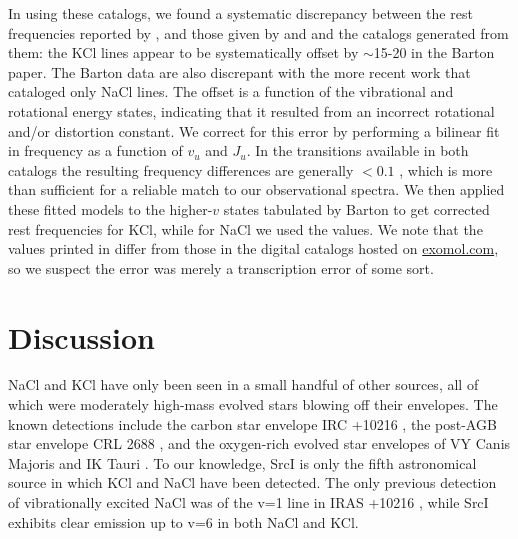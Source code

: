 \documentclass[twocolumn]{aastex62}
\newcommand{\sourcei}{SrcI\xspace}
\begin{document}
In using these catalogs, we found a systematic discrepancy between the rest
frequencies reported by \citet{Barton2014a}, and those given by
\citet{Caris2004a} and \citet{Caris2002a} and the catalogs generated from them:
the KCl lines appear to be systematically offset by $\sim$15-20 \kms in the
Barton paper.  The Barton data are also discrepant with the more recent
\citet{Cabezas2016a} work that cataloged only NaCl lines. The offset is a
function of the vibrational and rotational energy states, indicating that it
resulted from an incorrect rotational and/or distortion constant.  We correct
for this error by performing a bilinear fit in frequency as a function of $v_u$
and $J_u$.  In the transitions available in both catalogs the resulting
frequency differences are generally $<0.1$ \kms, which is more than sufficient
for a reliable match to our observational spectra.  We then applied these
fitted models to the higher-$v$ states tabulated by Barton to get corrected
rest frequencies for KCl, while for NaCl we used the \citet{Cabezas2016a}
values.  We note that the values printed in \citet{Barton2014a} differ from
those in the digital catalogs hosted on \url{exomol.com}, so we suspect the
error was merely a transcription error of some sort.










\section{Discussion}
NaCl and KCl have only been seen in a small handful of other sources, all of
which were moderately high-mass evolved stars blowing off their envelopes.  The
known detections include the carbon star envelope IRC +10216
\citep{Cernicharo1987a,Agundez2012a}, the post-AGB star envelope CRL 2688
\citep{Highberger2003a}, and the oxygen-rich evolved star envelopes of VY Canis
Majoris and IK Tauri \citep{Milam2007a}. To our knowledge, \sourcei is only the
fifth astronomical source in which KCl and NaCl have been detected.
The only previous detection of vibrationally excited NaCl was of the v=1
line in IRAS +10216 \citep{Quintana-Lacaci2016a}, 
while \sourcei exhibits clear emission up to v=6 in both NaCl and KCl.
\end{document}

